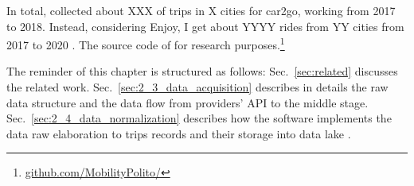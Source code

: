 
In total, \tool collected about XXX of trips in X cities for car2go, working from 2017 to 2018. Instead, considering Enjoy, I get about YYYY rides from YY cities from 2017 to 2020
. The source code of \tool for research purposes.\footnote{\url{github.com/MobilityPolito/}}


The reminder of this chapter is structured as follows: Sec.~\ref{sec:related} discusses the related work. Sec.~\ref{sec:2_3_data_acquisition} describes in details the raw data structure and the data flow from providers' API to the middle stage. Sec.~\ref{sec:2_4_data_normalization} describes how the software implements the data raw elaboration to trips records and their storage into data lake . 





%




